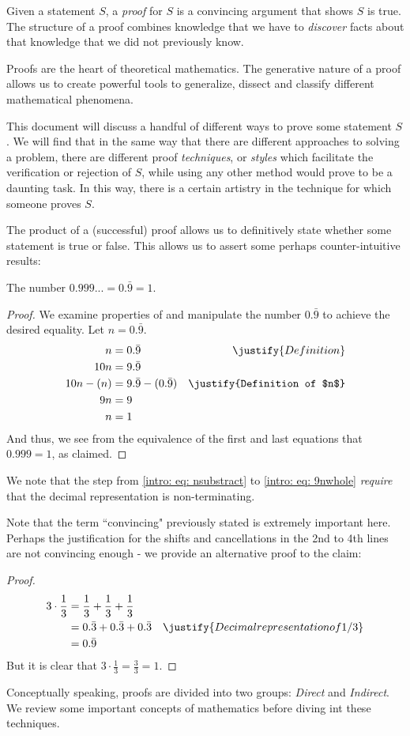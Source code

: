 \documentclass[../proofs.tex]{subfiles}
\begin{document}
Given a statement $S$, a \emph{proof} for $S$ is a convincing argument that
shows $S$ is true. The structure of a proof combines knowledge that we have to
\emph{discover} facts about that knowledge that we did not previously know.

Proofs are the heart of theoretical mathematics. The generative nature of a
proof allows us to create powerful tools to generalize, dissect and classify
different mathematical phenomena.

This document will discuss a handful of different ways to prove some statement
$S$. We will find that in the same way that there are different approaches to
solving a problem, there are different proof \emph{techniques}, or \emph{styles}
which facilitate the verification or rejection of $S$, while using any other
method would prove to be a daunting task. In this way, there is a certain
artistry in the technique for which someone proves $S$.

The product of a (successful) proof allows us to definitively state whether some
statement is true or false. This allows us to assert some perhaps
counter-intuitive results:
\begin{claim}
  The number $0.999... = 0.\bar{9} = 1$.
  \begin{proof}
    We examine properties of and manipulate the number $0.\bar{9}$ to achieve
    the desired equality. Let $n = 0.\bar{9}$.
    \begin{align}
       n  &= 0.\bar{9} & \justify{Definition}                             \\
       10n &= 9.\bar{9}   											                          \\
       10n - (n) &= 9.\bar{9} - (0.\bar{9}) & \justify{Definition of $n$} \label{intro: eq: nsubstract} \\
       9n &= 9                                                            \label{intro: eq: 9nwhole}\\
        n &= 1
    \end{align}
    And thus, we see from the equivalence of the first and last equations that $0.999 = 1$, as claimed.
  \end{proof}
\end{claim}
We note that the step from \ref{intro: eq: nsubstract} to
\ref{intro: eq: 9nwhole} \emph{require} that the decimal representation is
non-terminating.


Note that the term ``convincing" previously stated is extremely important here.
Perhaps the justification for the shifts and cancellations in the 2nd to 4th
lines are not convincing enough - we provide an alternative proof to the claim:
\begin{proof}
  \begin{align}
    3 \cdot \frac{1}{3} &= \frac{1}{3} + \frac{1}{3} + \frac{1}{3} \\
                        &= 0.\bar{3} + 0.\bar{3} + 0.\bar{3} & \justify{Decimal representation of 1/3} \\
                        &= 0.\bar{9}
  \end{align}
  But it is clear that $3 \cdot \frac{1}{3} = \frac{3}{3} = 1$.
\end{proof}

Conceptually speaking, proofs are divided into two groups: \emph{Direct} and
\emph{Indirect}. We review some important concepts of mathematics before diving
 int these techniques.
\end{document}
